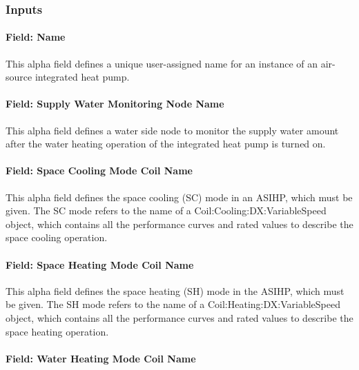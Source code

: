 \subsubsection{Inputs}\label{inputs-ASIHP}

\paragraph{Field: Name}\label{field-name-ASIHP}

This alpha field defines a unique user-assigned name for an instance of an air-source integrated heat pump. 

\paragraph{Field: Supply Water Monitoring Node Name}\label{Field-Supply-Water-Monitoring-Node-Name-ASIHP}

This alpha field defines a water side node to monitor the supply water amount after the water heating operation of the integrated heat pump is turned on. 

\paragraph{Field: Space Cooling Mode Coil Name}\label{Field-Space-Cooling-Mode-Coil-Name-ASIHP}

This alpha field defines the space cooling (SC) mode in an ASIHP, which must be given. The SC mode refers to the name of a Coil:Cooling:DX:VariableSpeed object, which contains all the performance curves and rated values to describe the space cooling operation. 

\paragraph{Field: Space Heating Mode Coil Name}\label{Field-Space-Heating-Mode-Coil-Name-ASIHP}

This alpha field defines the space heating (SH) mode in the ASIHP, which must be given. The SH mode refers to the name of a Coil:Heating:DX:VariableSpeed object, which contains all the performance curves and rated values to describe the space heating operation. 

\paragraph{Field: Water Heating Mode Coil Name}\label{Field-Water-Heating-Mode-Coil-Name-ASIHP}

